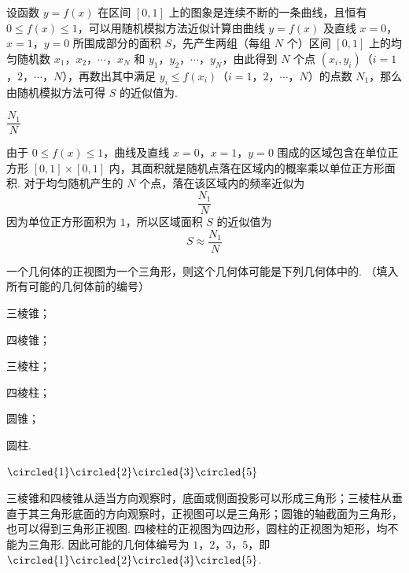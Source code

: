 \begin{problem}
设函数 \( y = f(x) \) 在区间 \([0,1]\) 上的图象是连续不断的一条曲线，且恒有 \( 0 \leqslant f(x) \leqslant 1 \)，可以用随机模拟方法近似计算由曲线 \( y = f(x) \) 及直线 \(x = 0\)，\(x = 1\)，\(y = 0\) 所围成部分的面积 \(S\)，先产生两组（每组 \(N\) 个）区间 \([0,1]\) 上的均匀随机数 \(x_1\)，\(x_2\)，\(\cdots\)，\(x_N\) 和 \(y_1\)，\(y_2\)，\(\cdots\)，\(y_N\)，由此得到 \(N\) 个点 \( (x_i, y_i) \)（\(i = 1\)，\(2\)，\(\cdots\)，\(N\)），再数出其中满足 \( y_i \leqslant f(x_i) \)（\(i = 1\)，\(2\)，\(\cdots\)，\(N\)）的点数 \(N_{1}\)，那么由随机模拟方法可得 \(S\) 的近似值为\fillinblank{}.
\end{problem}

\begin{answer}
\(\dfrac{N_{1}}{N}\)
\end{answer}

\begin{solution}
由于 \(0\leqslant f(x)\leqslant1\)，曲线及直线 \(x=0\)，\(x=1\)，\(y=0\) 围成的区域包含在单位正方形 \([0,1]\times[0,1]\) 内，其面积就是随机点落在区域内的概率乘以单位正方形面积. 对于均匀随机产生的 \(N\) 个点，落在该区域内的频率近似为
\[
\frac{N_{1}}{N}
\]
因为单位正方形面积为 \(1\)，所以区域面积 \(S\) 的近似值为
\[
S\approx\frac{N_{1}}{N}
\]
\end{solution}

\begin{problem}
一个几何体的正视图为一个三角形，则这个几何体可能是下列几何体中的\fillinblank{}. （填入所有可能的几何体前的编号）

\begin{circlelist}
\item 三棱锥；
\item 四棱锥；
\item 三棱柱；
\item 四棱柱；
\item 圆锥；
\item 圆柱.
\end{circlelist}
\end{problem}

\begin{answer}
\(\circled{1}\circled{2}\circled{3}\circled{5}\)
\end{answer}

\begin{solution}
三棱锥和四棱锥从适当方向观察时，底面或侧面投影可以形成三角形；三棱柱从垂直于其三角形底面的方向观察时，正视图可以是三角形；圆锥的轴截面为三角形，也可以得到三角形正视图. 四棱柱的正视图为四边形，圆柱的正视图为矩形，均不能为三角形. 因此可能的几何体编号为 \(1\)，\(2\)，\(3\)，\(5\)，即 \(\circled{1}\circled{2}\circled{3}\circled{5}\).
\end{solution}

